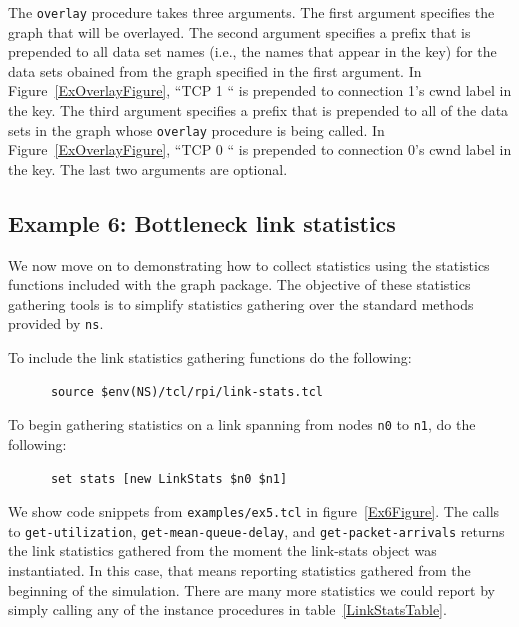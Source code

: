 \documentclass[11pt]{article}
\begin{document}
The \verb|overlay| procedure takes three arguments.  The first argument
specifies the graph that will be overlayed.  The second argument
specifies a prefix that is prepended to all data set names (i.e., the
names that appear in the key) for the data sets obained from the graph
specified in the first argument.  In Figure~\ref{ExOverlayFigure}, ``TCP 1
`` is prepended to connection 1's cwnd label in the key.  The third
argument specifies a prefix that is prepended to all of the data sets
in the graph whose \verb|overlay| procedure is being called.  In
Figure~\ref{ExOverlayFigure}, ``TCP 0 `` is prepended to connection 0's cwnd
label in the key.  The last two arguments are optional.


\subsection{Example 6: Bottleneck link statistics}

We now move on to demonstrating how to collect statistics using
the statistics functions included with the graph package.  
The objective of these statistics gathering tools is to simplify
statistics gathering over the standard methods provided by 
\verb|ns|.  

To include the link statistics gathering functions do the following:

\begin{verbatim}
      source $env(NS)/tcl/rpi/link-stats.tcl
\end{verbatim}

To begin gathering statistics on a link spanning from nodes \verb|n0|
to \verb|n1|, do the following:

\begin{verbatim}
      set stats [new LinkStats $n0 $n1]
\end{verbatim}

We show code snippets from \verb|examples/ex5.tcl| in
figure~\ref{Ex6Figure}.  The calls to \verb|get-utilization|,
\verb|get-mean-queue-delay|, and \verb|get-packet-arrivals| returns
the link statistics gathered from the moment the link-stats object was
instantiated.  In this case, that means reporting statistics gathered
from the beginning of the simulation.  There are many more statistics
we could report by simply calling any of the instance procedures in
table~\ref{LinkStatsTable}.
\end{document}
